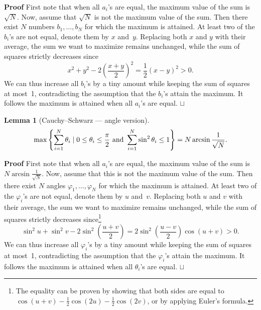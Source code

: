 \documentclass{article}
\newtheorem{lemma}[theorem]{Lemma}
\def\squareforqed{\hbox{\rlap{$\sqcap$}$\sqcup$}}
\def\qed{\ifmmode\squareforqed\else{\unskip\nobreak\hfil
\penalty50\hskip1em\null\nobreak\hfil\squareforqed
\parfillskip=0pt\finalhyphendemerits=0\endgraf}\fi}
\newenvironment{proof}{\begin{trivlist}\item[]{\flushleft\bf Proof }}
{\qed\end{trivlist}}
\begin{document}
\begin{proof}
  First note that when all $a_{i}$'s are equal, the maximum value of
  the sum is~$\sqrt{N}$.  Now, assume that $\sqrt{N}$ is not the
  maximum value of the sum.  Then there exist $N$ numbers
  $b_{1},\ldots,b_{N}$ for which the maximum is attained.  At least
  two of the $b_{i}$'s are not equal, denote them by $x$ and~$y$.
  Replacing both $x$ and $y$ with their average, the sum we want to
  maximize remains unchanged, while the sum of squares strictly
  decreases since
\begin{equation*}
x^{2}+y^{2}-2\left( \frac{x+y}{2}\right) ^{2}=\frac{1}{2}(x-y)^{2}>0.
\end{equation*}
We can thus increase all $b_i$'s by a tiny amount while keeping the
sum of squares at most~1, contradicting the assumption that the
$b_i$'s attain the maximum.  It follows the maximum is attained when
all $a_i$'s are equal.
\end{proof}

\begin{lemma}[Cauchy--Schwarz --- angle version]\label{lm:cs:angle}
\begin{equation}
\max\left\{ \sum\limits_{i=1}^{N} \theta_{i} 
  \mid 0 \leq \theta_{i} \leq \frac{\pi}{2}
  \textup{ and }
  \sum\limits_{i=1}^{N} \sin^2 \theta_{i} \leq 1 \right\} 
  = N \arcsin \frac{1}{\sqrt{N}}.
\end{equation}
\end{lemma}

\begin{proof}
  First note that when all $a_{i}$'s are equal, the maximum value of
  the sum is~$N \arcsin \frac{1}{\sqrt{N}}$.  Now, assume that this is
  not the maximum value of the sum.  Then there exist $N$ angles
  $\varphi_{1},\ldots,\varphi_{N}$ for which the maximum is attained.
  At least two of the $\varphi_{i}$'s are not equal, denote them by
  $u$ and~$v$.  Replacing both $u$ and $v$ with their average, the sum
  we want to maximize remains unchanged, while the sum of squares
  strictly decreases since\footnote{The equality can be proven by
    showing that both sides are equal to $\cos(u+v) -
    \frac{1}{2}\cos(2u) - \frac{1}{2}\cos(2v)$, or by applying Euler's
    formula.}
\begin{equation*}
  \sin ^{2}u+\sin ^{2}v-2\sin ^{2}\left( \frac{u+v}{2}\right) =2\sin
  ^{2}\left( \frac{u-v}{2}\right) \cos (u+v)>0.
\end{equation*}
We can thus increase all $\varphi_i$'s by a tiny amount while keeping
the sum of squares at most~1, contradicting the assumption that the
$\varphi_i$'s attain the maximum.  It follows the maximum is attained
when all $\theta_i$'s are equal.
\end{proof}
\end{document}
